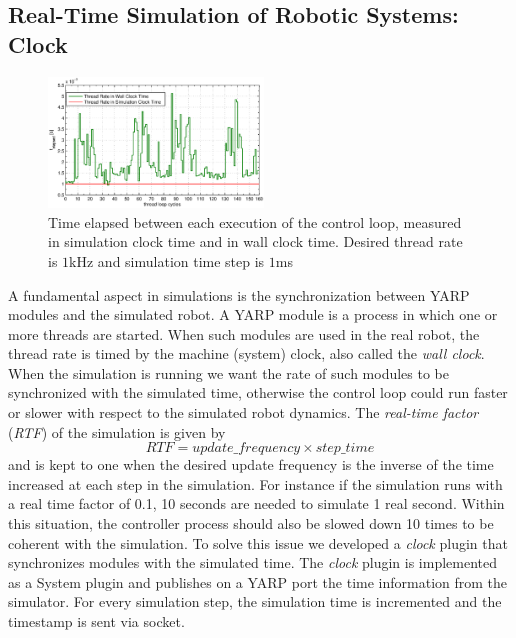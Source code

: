 \subsection{Real-Time Simulation of Robotic Systems: Clock}
\begin{figure}
  \centering
    \hspace*{-0.25in}
    \includegraphics[width=0.51\textwidth]{images/yarp_clock.eps}
    \caption{Time elapsed between each execution of the control loop, measured in simulation clock time and in wall clock time. Desired thread rate is $1$kHz and simulation time step is $1$ms}\label{yarp_clock_real_vs_simulated}
\end{figure}
A fundamental aspect in simulations is the synchronization between YARP modules and the simulated robot. A YARP module is a process in which one or more threads are started. When such modules are used in the real robot, the thread rate is timed by the machine (system) clock, also called the \emph{wall clock}. When the simulation is running we want the rate of such modules to be synchronized with the simulated time, otherwise the control loop could run faster or slower with respect to the simulated robot dynamics.
The \emph{real-time factor} (\emph{RTF}) of the simulation is given by 
\begin{equation}
    RTF = update\_frequency \times step\_time
\end{equation}
and is kept to one when the desired update frequency is the inverse of the time increased at each step in the simulation.
For instance if the simulation runs with a real time factor of 0.1, 10 seconds are needed to simulate 1 real second. Within this situation, the controller process should also be slowed down 10 times to be coherent with the simulation. To solve this issue we developed a \emph{clock} plugin that synchronizes modules with the simulated time.
The \emph{clock} plugin is implemented as a System plugin and publishes on a YARP port the time information from the simulator. For every simulation step, the simulation time is incremented and the timestamp is sent via socket.

